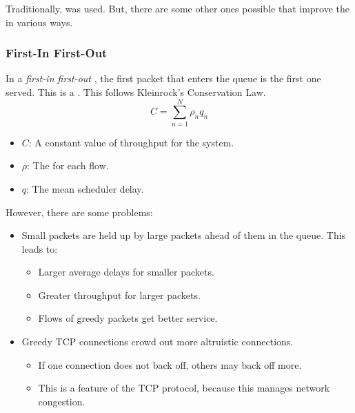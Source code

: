 Traditionally,  was used.
But, there are some other ones possible that improve the  in various ways.

\subsubsection{First-In First-Out}\label{subsubsec:FIFO}
\begin{definition}\label{def:FIFO}
  In a \emph{first-in first-out} , the first packet that enters the queue is the first one served.
  This is a  .
  This follows Kleinrock's Conservation Law.
  \begin{equation}\label{eq:Kleinrocks_Conservation_Law}
    C = \sum\limits_{n=1}^{N} \rho_{n} q_{n}
  \end{equation}
  \begin{itemize}[noitemsep]
  \item $C$: A constant value of throughput for the system.
  \item $\rho$: The  for each flow.
  \item $q$: The mean scheduler delay.
  \end{itemize}
  
  However, there are some problems:
  \begin{itemize}[noitemsep]
  \item Small packets are held up by large packets ahead of them in the queue. This leads to:
    \begin{itemize}[noitemsep]
    \item Larger average delays for smaller packets.
    \item Greater throughput for larger packets.
    \item Flows of greedy packets get better service.
    \end{itemize}
  \item Greedy TCP connections crowd out more altruistic connections.
    \begin{itemize}[noitemsep]
    \item If one connection does not back off, others may back off more.
    \item This is a feature of the TCP protocol, because this manages network congestion.
    \end{itemize}
  \end{itemize}
\end{definition}

